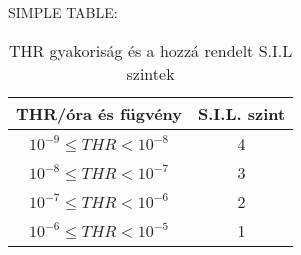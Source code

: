SIMPLE TABLE:
\begin{table}[!htbp]
    \centering
    \begin{tabular}{|c|c|}\hline
        THR/óra és fügvény & S.I.L. szint \\ \hline
        $10^{-9} \leq THR < 10^{-8}$ & 4 \\ \hline
        $10^{-8} \leq THR < 10^{-7}$ & 3  \\ \hline
        $10^{-7} \leq THR < 10^{-6}$ & 2 \\ \hline
        $10^{-6} \leq THR < 10^{-5}$ & 1 \\ \hline
    \end{tabular}
    \caption[S.I.L szintek]{THR gyakoriság és a hozzá rendelt S.I.L szintek}
    \label{sil_levels}
\end{table}